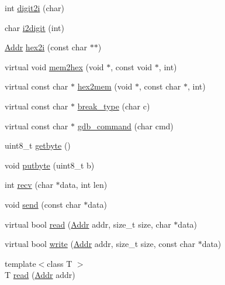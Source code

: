 \begin{DoxyCompactItemize}
\item 
int \hyperlink{classBaseRemoteGDB_a32f99cfc81ba23dc0b61a0e11373e1da}{digit2i} (char)
\item 
char \hyperlink{classBaseRemoteGDB_a380e69e2af0b61c399efe68818bed2e2}{i2digit} (int)
\item 
\hyperlink{base_2types_8hh_af1bb03d6a4ee096394a6749f0a169232}{Addr} \hyperlink{classBaseRemoteGDB_a9d71b1350a41827aa3c4e34409222bc4}{hex2i} (const char $\ast$$\ast$)
\item 
virtual void \hyperlink{classBaseRemoteGDB_ae31bb2c456fc82307f7ab60a59d81e62}{mem2hex} (void $\ast$, const void $\ast$, int)
\item 
virtual const char $\ast$ \hyperlink{classBaseRemoteGDB_a1c09904ab1f0dfd53045815c8023ed99}{hex2mem} (void $\ast$, const char $\ast$, int)
\item 
virtual const char $\ast$ \hyperlink{classBaseRemoteGDB_a16c567d9c992eb13819358b18ab219b6}{break\_\-type} (char c)
\item 
virtual const char $\ast$ \hyperlink{classBaseRemoteGDB_a7bbbec7a5e05f7f9ae638bbe1b72b1d8}{gdb\_\-command} (char cmd)
\item 
uint8\_\-t \hyperlink{classBaseRemoteGDB_a605a0b1dc1ef87abf31b307291475efd}{getbyte} ()
\item 
void \hyperlink{classBaseRemoteGDB_af81af327543d8feab2b0bcc83170d68c}{putbyte} (uint8\_\-t b)
\item 
int \hyperlink{classBaseRemoteGDB_ad39aca9b61a4b34960108fd7c70a40ef}{recv} (char $\ast$data, int len)
\item 
void \hyperlink{classBaseRemoteGDB_ab5ecea9b4516973a35d89b23c4b7961f}{send} (const char $\ast$data)
\item 
virtual bool \hyperlink{classBaseRemoteGDB_a08b012fff4ed4c4cd0f91b482551c75c}{read} (\hyperlink{base_2types_8hh_af1bb03d6a4ee096394a6749f0a169232}{Addr} addr, size\_\-t size, char $\ast$data)
\item 
virtual bool \hyperlink{classBaseRemoteGDB_afbada55bb9d0e9c8c26bb48cb5890111}{write} (\hyperlink{base_2types_8hh_af1bb03d6a4ee096394a6749f0a169232}{Addr} addr, size\_\-t size, const char $\ast$data)
\item 
{\footnotesize template$<$class T $>$ }\\T \hyperlink{classBaseRemoteGDB_a3bfd45e5030624d2d72405e15a25d961}{read} (\hyperlink{base_2types_8hh_af1bb03d6a4ee096394a6749f0a169232}{Addr} addr)
\item 
$$
\end{DoxyCompactItemize}
